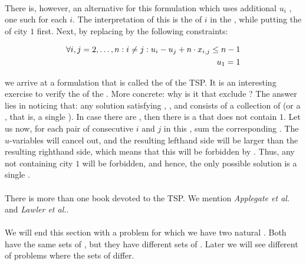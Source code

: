 \paragraph{}
There is, however, an alternative for this formulation which uses additional  $u_i$ , one such  for each  $i$. The interpretation of this  is the  of  $i$ in the , while putting the  of city $1$ first. Next, by replacing  by the following constraints:

\begin{eqnarray}
\forall \rangei[i,j]{2}{n}:i\neq j:u_i-u_j+n\cdot x_{i,j}\leq n-1\eqnlab{mtz-c1}\\
u_1=1\eqnlab{mtz-c2}
\end{eqnarray}

we arrive at a formulation that is called the  of the TSP. It is an interesting exercise to verify the  of the . More concrete: why is it that  exclude ? The answer lies in noticing that: any solution satisfying , , and  consists of a collection of  (or a , that is, a single ). In case there are , then there is a  that does not contain  $1$. Let us now, for each pair of consecutive  $i$ and $j$ in this , sum the corresponding  . The $u$-variables will cancel out, and the resulting lefthand side will be larger than the resulting righthand side, which means that this  will be forbidden by . Thus, any  not containing city $1$ will be forbidden, and hence, the only possible solution is a single .

\paragraph{}
There is more than one book devoted to the TSP. We mention \emph{Applegate et al.}\cite{Applegate.2006} and \emph{Lawler et al.}\cite{Lawler85}.

\paragraph{}
We will end this section with a problem for which we have two natural . Both  have the same sets of , but they have different sets of . Later we will see different  of problems where the sets of  differ.


